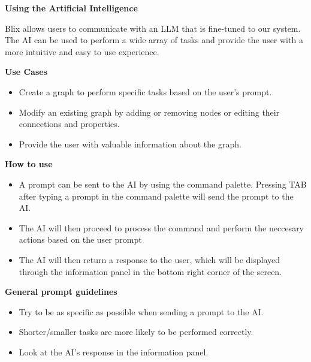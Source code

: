 \documentclass[11pt,a4paper]{article}
\begin{document}
\textbf{Using the Artificial Intelligence}

Blix allows users to communicate with an LLM that is fine-tuned to our system. The AI can be used to perform a wide array of tasks and provide the user with a more intuitive and easy to use experience.


\textbf{Use Cases}

\begin{itemize}
  \item[\textbullet] Create a graph to perform  specific tasks based on the user's prompt.
  \item[\textbullet] Modify an existing graph by adding or removing nodes or editing their connections and properties.
  \item[\textbullet] Provide the user with valuable information about the graph.
\end{itemize}

\textbf{How to use}

\begin{itemize}
  \item[\textbullet] A prompt can be sent to the AI by using the command palette. Pressing TAB after typing a prompt in the command palette will send the prompt to the AI.
  \item[\textbullet] The AI will then proceed to process the command and perform the neccesary actions based on the user prompt
  \item[\textbullet] The AI will then return a response to the user, which will be displayed through the information panel in the bottom right corner of the screen.
\end{itemize}


\textbf{General prompt guidelines}

\begin{itemize}
  \item[\textbullet] Try to be as specific as possible when sending a prompt to the AI.
  \item[\textbullet] Shorter/smaller tasks are more likely to be performed correctly.
  \item[\textbullet] Look at the AI's response in the information panel.
\end{itemize}
 
\end{document}

